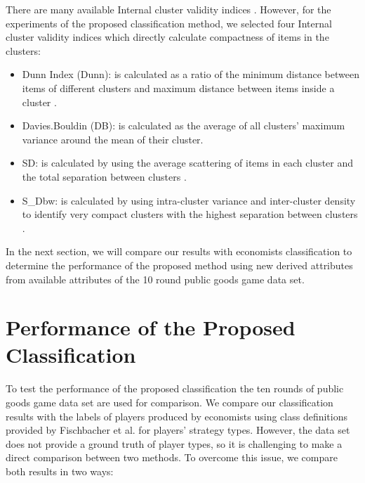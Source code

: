 There are many available Internal cluster validity indices \cite{JegathaDeborah2010}. However, for the experiments of the proposed classification method, we selected four Internal cluster validity indices which directly calculate compactness of items in the clusters:

\begin{itemize}
    
    \item Dunn Index (Dunn): is calculated as a ratio of the minimum distance between items of different clusters and maximum distance between items inside a cluster \cite{Dunn1973a}. 
    
    \item Davies.Bouldin (DB): is calculated as the average of all clusters' maximum variance around the mean of their cluster. \cite{Davies1979a}
    
    \item SD: is calculated by using the average scattering of items in each cluster and the total separation between clusters \cite{Halkidi2002}.
    
    \item S\_Dbw: is calculated by using intra-cluster variance and inter-cluster density to identify very compact clusters with the highest separation between clusters \cite{Halkidi2002}. 
\end{itemize}

In the next section, we will compare our results with economists classification to determine the performance of the proposed method using new derived attributes from available attributes of the 10 round public goods game data set.


\section{Performance of the Proposed Classification}

To test the performance of the proposed classification the ten rounds of public goods game data set are used for comparison. We compare our classification results with the labels of players produced by economists using class definitions provided by Fischbacher et al. \cite{Fischbacher2001} for players' strategy types. However, the data set does not provide a ground truth of player types, so it is challenging to make a direct comparison between two methods. To overcome this issue, we compare both results in two ways:

